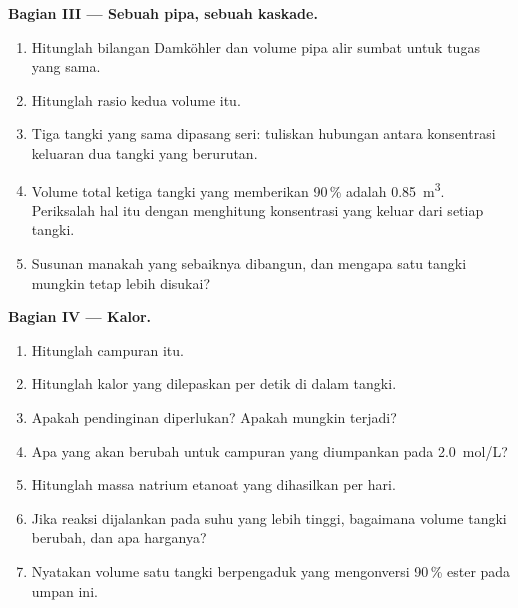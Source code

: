 \begin{problem}
\medskip
\noindent\textbf{Bagian III --- Sebuah pipa, sebuah kaskade.}
\begin{enumerate}[resume]
  \item Hitunglah bilangan Damköhler dan volume pipa alir sumbat untuk
        tugas yang sama.
  \item Hitunglah rasio kedua volume itu.
  \item Tiga tangki yang sama dipasang seri: tuliskan hubungan antara
        konsentrasi keluaran dua tangki yang berurutan.
  \item Volume total ketiga tangki yang memberikan 90\,\% adalah
        \qty{0.85}{m^3}. Periksalah hal itu dengan menghitung konsentrasi
        yang keluar dari setiap tangki.
  \item Susunan manakah yang sebaiknya dibangun, dan mengapa satu tangki
        mungkin tetap lebih disukai?
\end{enumerate}

\medskip
\noindent\textbf{Bagian IV --- Kalor.}
\begin{enumerate}[resume]
  \item Hitunglah  campuran itu.
  \item Hitunglah kalor yang dilepaskan per detik di dalam tangki.
  \item Apakah pendinginan diperlukan? Apakah  mungkin
        terjadi?
  \item Apa yang akan berubah untuk campuran yang diumpankan pada
        \qty{2.0}{mol/L}?
  \item Hitunglah massa natrium etanoat yang dihasilkan per hari.
  \item Jika reaksi dijalankan pada suhu yang lebih tinggi, bagaimana
        volume tangki berubah, dan apa harganya?
  \item Nyatakan volume satu tangki berpengaduk yang mengonversi 90\,\%
        ester pada umpan ini.
\end{enumerate}
\end{problem}
